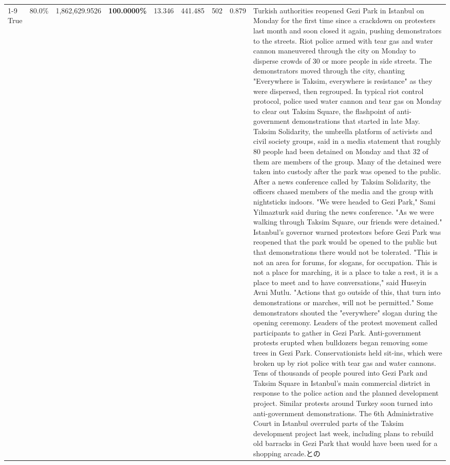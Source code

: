 \begin{table}[H]
\begin{tabular}{lllrlllll}
\cline{1-9}
True & 80.0\% & 1,862,629.9526 & \bfseries \color{red} 100.0000\% & 13.346 & 441.485 & 502 & 0.879 & Turkish authorities reopened Gezi Park in Istanbul on Monday for the first time since a crackdown on protesters last month and soon closed it again, pushing demonstrators to the streets. Riot police armed with tear gas and water cannon maneuvered through the city on Monday to disperse crowds of 30 or more people in side streets. The demonstrators moved through the city, chanting "Everywhere is Taksim, everywhere is resistance" as they were dispersed, then regrouped. In typical riot control protocol, police used water cannon and tear gas on Monday to clear out Taksim Square, the flashpoint of anti-government demonstrations that started in late May. Taksim Solidarity, the umbrella platform of activists and civil society groups, said in a media statement that roughly 80 people had been detained on Monday and that 32 of them are members of the group. Many of the detained were taken into custody after the park was opened to the public. After a news conference called by Taksim Solidarity, the officers chased members of the media and the group with nightsticks indoors. "We were headed to Gezi Park," Sami Yilmazturk said during the news conference. "As we were walking through Taksim Square, our friends were detained." Istanbul's governor warned protestors before Gezi Park was reopened that the park would be opened to the public but that demonstrations there would not be tolerated. "This is not an area for forums, for slogans, for occupation. This is not a place for marching, it is a place to take a rest, it is a place to meet and to have conversations," said Huseyin Avni Mutlu. "Actions that go outside of this, that turn into demonstrations or marches, will not be permitted." Some demonstrators shouted the "everywhere" slogan during the opening ceremony. Leaders of the protest movement called participants to gather in Gezi Park. Anti-government protests erupted when bulldozers began removing some trees in Gezi Park. Conservationists held sit-ins, which were broken up by riot police with tear gas and water cannons. Tens of thousands of people poured into Gezi Park and Taksim Square in Istanbul's main commercial district in response to the police action and the planned development project. Similar protests around Turkey soon turned into anti-government demonstrations. The 6th Administrative Court in Istanbul overruled parts of the Taksim development project last week, including plans to rebuild old barracks in Gezi Park that would have been used for a shopping arcade.との \\

\end{tabular}
\end{table}
